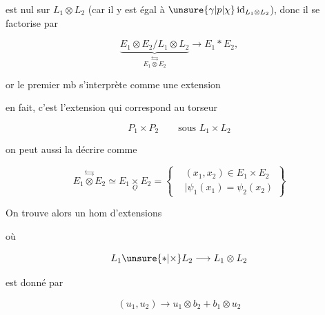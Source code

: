 

est nul sur  $L_1\otimes L_2$ (car il y est égal à $\unsure{\gamma|p|\chi}\,{\rm id}_{L_1\otimes L_2}$), donc il se factorise par

\[ \underbrace{E_1\otimes E_2/L_1\otimes L_2}_{E_1\overset{\leftrightarrows}{\otimes}E_2}\longrightarrow E_1*E_2,\tag*{$(*)$} \]

or le premier mb s'interprète comme une extension


en fait, c'est l'extension qui correspond au torseur

\[ P_1\times P_2\qquad\text{sous }L_1\times L_2 \]

on peut aussi la décrire comme

\[ E_1\overset{\leftrightarrows}{\otimes}E_2\simeq E_1\underset{\underline O}{\times}E_2=\left\{\begin{aligned}&(x_1,x_2)\in E_1\times E_2\\ &\mid\psi_1(x_1)=\psi_2(x_2)\end{aligned}\right\} \]

On trouve alors un hom d'extensions


où

\[ L_1\unsure{*|\times}L_2\longrightarrow L_1\otimes L_2 \]

est donné par

\[ (u_1,u_2)\longrightarrow u_1\otimes b_2+b_1\otimes u_2 \]

